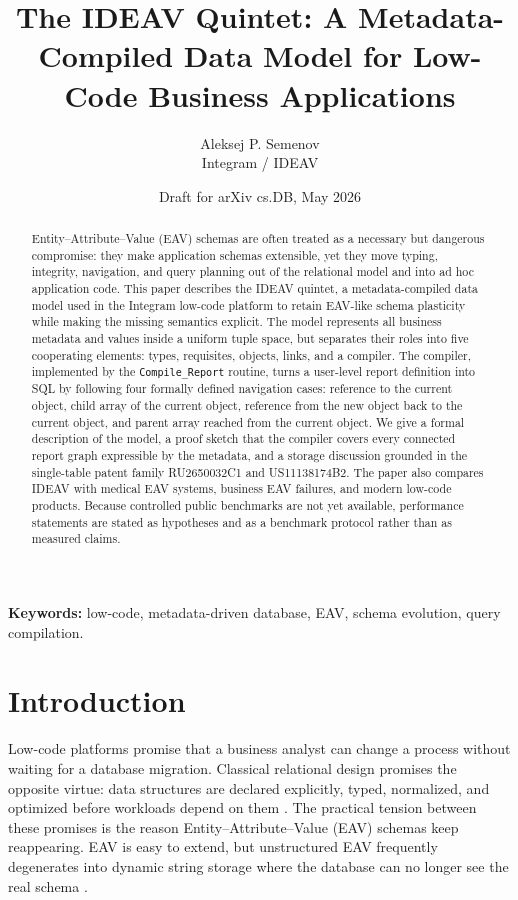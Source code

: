 \documentclass[11pt]{article}
\title{The IDEAV Quintet: A Metadata-Compiled Data Model for Low-Code Business Applications}
\author{Aleksej P. Semenov\\Integram / IDEAV}
\date{Draft for arXiv cs.DB, May 2026}
\begin{document}
\maketitle

\begin{abstract}
Entity--Attribute--Value (EAV) schemas are often treated as a necessary but
dangerous compromise: they make application schemas extensible, yet they move
typing, integrity, navigation, and query planning out of the relational model
and into ad hoc application code. This paper describes the IDEAV quintet, a
metadata-compiled data model used in the Integram low-code platform to retain
EAV-like schema plasticity while making the missing semantics explicit. The
model represents all business metadata and values inside a uniform tuple space,
but separates their roles into five cooperating elements: types, requisites,
objects, links, and a compiler. The compiler, implemented by the
\texttt{Compile\_Report} routine, turns a user-level report definition into SQL
by following four formally defined navigation cases: reference to the current
object, child array of the current object, reference from the new object back to
the current object, and parent array reached from the current object. We give a
formal description of the model, a proof sketch that the compiler covers every
connected report graph expressible by the metadata, and a storage discussion
grounded in the single-table patent family RU2650032C1 and US11138174B2. The
paper also compares IDEAV with medical EAV systems, business EAV failures, and
modern low-code products. Because controlled public benchmarks are not yet
available, performance statements are stated as hypotheses and as a benchmark
protocol rather than as measured claims.
\end{abstract}

\noindent\textbf{Keywords:} low-code, metadata-driven database, EAV, schema evolution, query compilation.

\section{Introduction}

Low-code platforms promise that a business analyst can change a process without
waiting for a database migration. Classical relational design promises the
opposite virtue: data structures are declared explicitly, typed, normalized, and
optimized before workloads depend on them \citep{codd1970relational}. The
practical tension between these promises is the reason Entity--Attribute--Value
(EAV) schemas keep reappearing. EAV is easy to extend, but unstructured EAV
frequently degenerates into dynamic string storage where the database can no
longer see the real schema \citep{karwin2010sql,kyte2003effective}.
\end{document}
